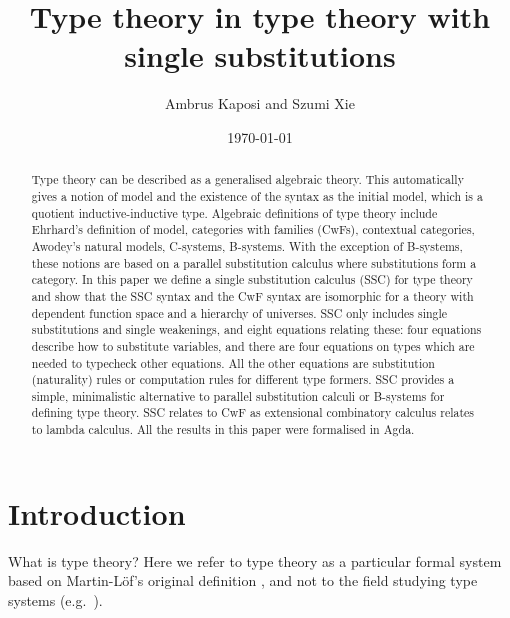 \documentclass[sigplan,10pt,anonymous,review]{acmart}\settopmatter{printfolios=true,printccs=false,printacmref=false}
\begin{document}
\title{Type theory in type theory with single substitutions}
\author{Ambrus Kaposi and Szumi Xie}
\date{\today}

\begin{abstract}
Type theory can be described as a generalised algebraic theory. This
automatically gives a notion of model and the existence of the syntax
as the initial model, which is a quotient inductive-inductive
type. Algebraic definitions of type theory include Ehrhard's
definition of model, categories with families (CwFs), contextual
categories, Awodey's natural models, C-systems, B-systems. With the
exception of B-systems, these notions are based on a parallel
substitution calculus where substitutions form a category. In this
paper we define a single substitution calculus (SSC) for type theory
and show that the SSC syntax and the CwF syntax are isomorphic for a
theory with dependent function space and a hierarchy of universes. SSC
only includes single substitutions and single weakenings, and eight
equations relating these: four equations describe how to substitute
variables, and there are four equations on types which are needed to
typecheck other equations. All the other equations are substitution
(naturality) rules or computation rules for different type
formers. SSC provides a simple, minimalistic alternative to parallel
substitution calculi or B-systems for defining type theory. SSC
relates to CwF as extensional combinatory calculus relates to lambda
calculus. All the results in this paper were formalised in Agda.
\end{abstract}

\maketitle

\section{Introduction}

What is type theory? Here we refer to type theory as a particular
formal system based on Martin-Löf's original definition
\cite{martinlof73predicative}, and not to the field studying type
systems (e.g.\ \cite{DBLP:books/daglib/0005958}).
\end{document}
